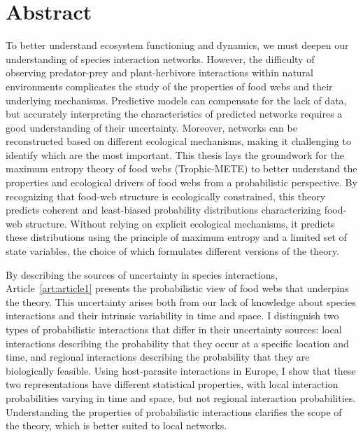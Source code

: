\documentclass[12pt,twoside,phd]{dms}
\numberwithin{equation}{section}
\numberwithin{table}{chapter}
\numberwithin{figure}{chapter}
\begin{document}
\anglais
\chapter*{Abstract}

To better understand ecosystem functioning and dynamics, we must deepen our
understanding of species interaction networks. However, the difficulty of
observing predator-prey and plant-herbivore interactions within natural
environments complicates the study of the properties of food webs and their
underlying mechanisms. Predictive models can compensate for the lack of data,
but accurately interpreting the characteristics of predicted networks requires a
good understanding of their uncertainty. Moreover, networks can be reconstructed
based on different ecological mechanisms, making it challenging to identify
which are the most important. This thesis lays the groundwork for the maximum
entropy theory of food webs (Trophic-METE) to better understand the properties
and ecological drivers of food webs from a probabilistic perspective. By
recognizing that food-web structure is ecologically constrained, this theory
predicts coherent and least-biased probability distributions characterizing
food-web structure. Without relying on explicit ecological mechanisms, it
predicts these distributions using the principle of maximum entropy and a
limited set of state variables, the choice of which formulates different
versions of the theory.

By describing the sources of uncertainty in species interactions,
Article~\ref{art:article1} presents the probabilistic view of food webs that
underpins the theory. This uncertainty arises both from our lack of knowledge
about species interactions and their intrinsic variability in time and space. I
distinguish two types of probabilistic interactions that differ in their
uncertainty sources: local interactions describing the probability that they
occur at a specific location and time, and regional interactions describing the
probability that they are biologically feasible. Using host-parasite
interactions in Europe, I show that these two representations have different
statistical properties, with local interaction probabilities varying in time and
space, but not regional interaction probabilities. Understanding the properties
of probabilistic interactions clarifies the scope of the theory, which is better
suited to local networks.
\end{document}
